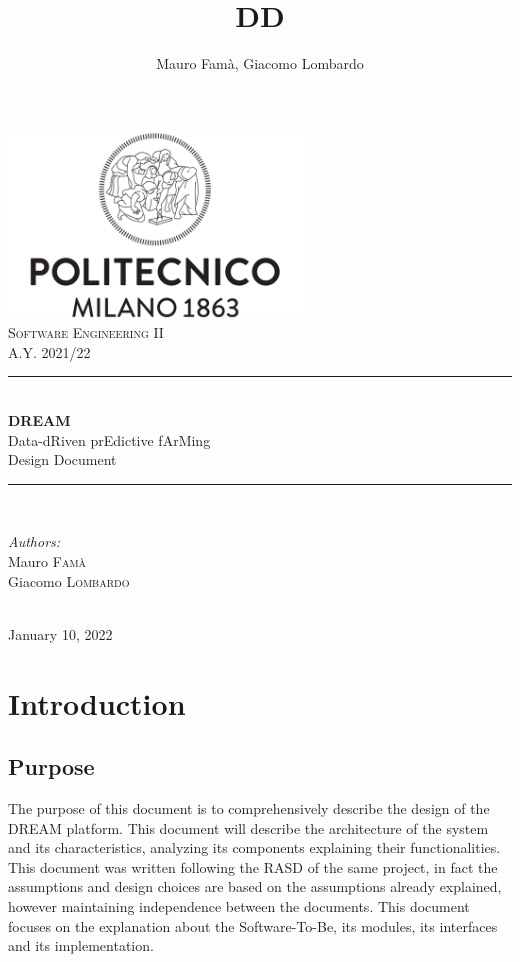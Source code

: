 \documentclass[10pt]{article} %
\title{DD}
\author{Mauro Famà, Giacomo Lombardo}
\begin{document}
\thispagestyle{empty}
\begin{titlepage}
    \newcommand{\HRule}{\rule{\linewidth}{0.5mm}}
    \center
    \includegraphics[width=8cm]{polimi.png}\\[1cm]

    \textsc{\Large Software Engineering II}\\[0.5cm]
    \textsc{\large A.Y. 2021/22}\\[0.5cm]

    \HRule \\[0.4cm]
        { \Huge \bfseries DREAM}\\[0.2cm]
        { \large Data-dRiven prEdictive fArMing}\\[0.4cm]
        { \LARGE Design Document}
    \HRule \\[1.5cm]

    \begin{minipage}{0.4\textwidth}
        \begin{flushleft} \large
        \emph{Authors:}\\
        Mauro \textsc{Famà}\\
        Giacomo \textsc{Lombardo}\\
        \end{flushleft}
    \end{minipage}\\[2cm]

    {\large January 10, 2022}\\[2cm]
    
    \vfill
\end{titlepage}
\newpage
\tableofcontents %
\newpage
\section{Introduction}
\subsection{Purpose}
The purpose of this document is to comprehensively describe the design of the DREAM platform\cite{assignment}. %
This document will describe the architecture of the system and its characteristics, 
analyzing its components explaining their functionalities.\\
This document was written following the RASD\cite{rasd} of the same project, 
in fact the assumptions and design choices are based on the assumptions already explained, 
however maintaining independence between the documents. This document focuses on the explanation 
about the Software-To-Be, its modules, its interfaces and its implementation.
\end{document}
